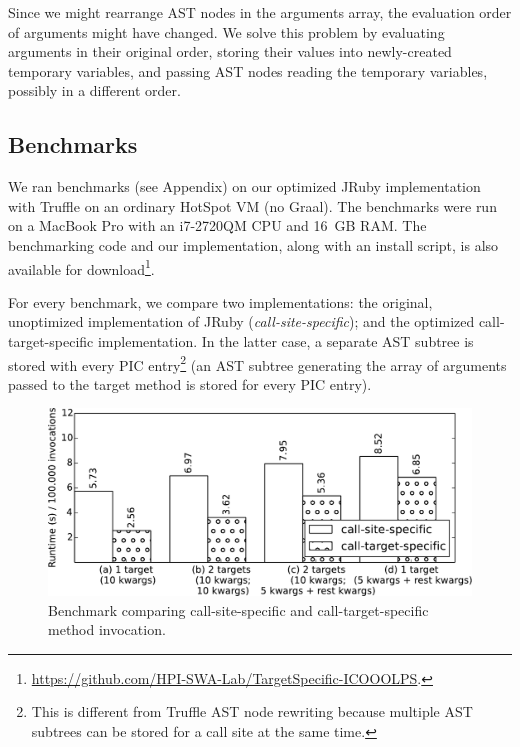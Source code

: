 \documentclass{sigplanconf} %
\begin{document}
Since we might rearrange AST nodes in the arguments array, the evaluation order of arguments might have changed. We solve this problem by evaluating arguments in their original order, storing their values into newly-created temporary variables, and passing AST nodes reading the temporary variables, possibly in a different order.

\subsection{Benchmarks}
We ran benchmarks (see Appendix) on our optimized JRuby implementation with Truffle on an ordinary HotSpot VM (no Graal). The benchmarks were run on a MacBook Pro with an i7-2720QM CPU and 16~GB RAM. The benchmarking code and our implementation, along with an install script, is also available for download\footnote{\mbox{\url{https://github.com/HPI-SWA-Lab/TargetSpecific-ICOOOLPS}}.}.

For every benchmark, we compare two implementations: the original, unoptimized implementation of JRuby (\emph{call-site-specific}); and the optimized call-target-specific implementation. In the latter case, a separate AST subtree is stored with every PIC entry\footnote{This is different from Truffle AST node rewriting because multiple AST subtrees can be stored for a call site at the same time.} (an AST subtree generating the array of arguments passed to the target method is stored for every PIC entry).

\begin{figure}[!htp]
\includegraphics[width=\linewidth]{resources/benchmark}
\caption{Benchmark comparing call-site-specific and call-target-specific method invocation.}
\label{fig:benchmark}
\end{figure}
\end{document}
